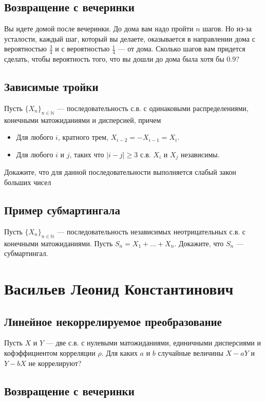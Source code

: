\documentclass[12pt]{article}
\newcommand\N{\mathbb{N}}
\begin{document}
\subsection{Возвращение с вечеринки}

Вы идете домой после вечеринки. До дома вам надо пройти $n$ шагов. Но из-за усталости, каждый шаг, который вы делаете, оказывается в направлении дома с вероятностью $\frac{3}{4}$ и с вероятностью $\frac{1}{4}$ --- от дома. Сколько шагов вам придется сделать, чтобы вероятность того, что вы дошли до дома была хотя бы $0.9$?

\subsection{Зависимые тройки}
Пусть $\{X_n\}_{n \in \N}$ --- последовательность с.в. с одинаковыми распределениями, конечными матожиданиями и дисперсией, причем
\begin{itemize}
    \item Для любого $i$, кратного трем, $X_{i - 2} = - X_{i - 1} = X_{i}$. 
    \item Для любого $i$ и $j$, таких что $|i - j| \ge 3$ с.в. $X_i$ и $X_j$ независимы.
\end{itemize}
Докажите, что для данной последовательности выполняется слабый закон больших чисел


\subsection{Пример субмартингала}

Пусть $\{X_n\}_{n \in \N}$ --- последовательность независимых неотрицательных с.в. с конечными матожиданиями. Пусть $S_n = X_1 + \dots + X_n$. Докажите, что $S_n$ --- субмартингал.

\newpage
\section{Васильев Леонид Константинович}

\subsection{Линейное некоррелируемое преобразование}

Пусть $X$ и $Y$ --- две с.в. с нулевыми матожиданиями, единичными дисперсиями и кофэффициентом корреляции $\rho$. Для каких $a$ и $b$ случайные величины $X - aY$ и $Y - bX$ не коррелируют?


\subsection{Возвращение с вечеринки}
\end{document}
